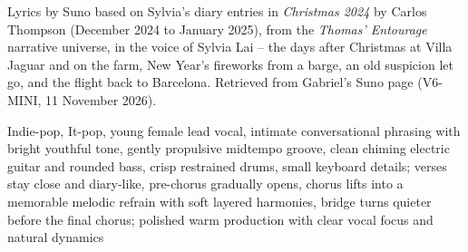 
\label{sec:folded-in-my-coat}
\begin{notes}
Lyrics by Suno based on Sylvia's diary entries in \emph{Christmas 2024} by Carlos Thompson (December 2024 to January 2025), from the \emph{Thomas' Entourage} narrative universe, in the voice of Sylvia Lai -- the days after Christmas at Villa Jaguar and on the farm, New Year's fireworks from a barge, an old suspicion let go, and the flight back to Barcelona. Retrieved from Gabriel's Suno page (V6-MINI, 11 November 2026).
\end{notes}
\begin{style}
Indie-pop, It-pop, young female lead vocal, intimate conversational phrasing with bright youthful tone, gently propulsive midtempo groove, clean chiming electric guitar and rounded bass, crisp restrained drums, small keyboard details; verses stay close and diary-like, pre-chorus gradually opens, chorus lifts into a memorable melodic refrain with soft layered harmonies, bridge turns quieter before the final chorus; polished warm production with clear vocal focus and natural dynamics
\end{style}
